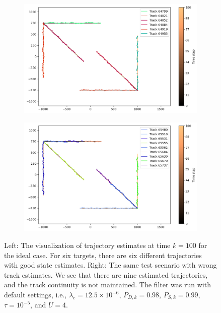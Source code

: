 \begin{figure}
    \centering
    \begin{subfigure}[]{0.48\linewidth}
        \centering
        \includegraphics[width=\linewidth]{figures/c2-traj-good.png}
    \end{subfigure}
    \hfill
    \begin{subfigure}[]{0.48\linewidth}
        \centering
        \includegraphics[width=\linewidth]{figures/c2-traj-bad.png}
    \end{subfigure}
  \caption[(C2). Comparison of trajectories estimates.]{Left: The visualization of trajectory estimates at time $k=100$ for the ideal case. For six targets, there are six different trajectories with good state estimates. Right: The same test scenario with wrong track estimates. We see that there are nine estimated trajectories, and the track continuity is not maintained. The filter was run with default settings, i.e., $\lambda_{c} = 12.5 \times 10^{-6}$, $P_{D,k} = 0.98$, $P_{S,k} = 0.99$, $\tau = 10^{-5}$, and $U=4$.}
  \label{fig:c2-track-continuity}
\end{figure}

